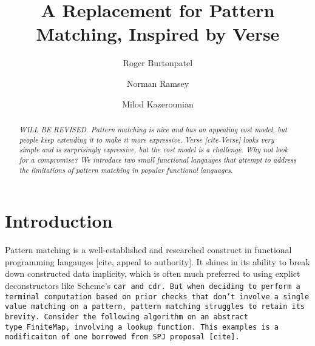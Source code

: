 \documentclass[manuscript,screen,review, 12pt]{acmart}
\begin{document}
\title{A Replacement for Pattern Matching, Inspired by Verse}

\author{Roger Burtonpatel}

\author{Norman Ramsey}

\author{Milod Kazerounian}

\renewcommand{\shortauthors}{Burtonpatel et al.}

\begin{abstract}
    \it{WILL BE REVISED.}
  Pattern matching is nice and has an appealing cost model, but people keep
  extending it to make it more expressive. Verse [cite-Verse] looks very simple
  and is surprisingly expressive, but the cost model is a challenge. Why not
  look for a compromise? We introduce two small functional langauges that
  attempt to address the limitations of pattern matching in popular functional
  languages.
  \end{abstract}

\maketitle

\section{Introduction}
Pattern matching is a well-established and researched construct in functional
programming langauges [cite, appeal to authority]. It shines in its ability to
break down constructed data implicity, which is often much preferred to using
explict deconstructors like Scheme's \tt{car} and \tt{cdr}. But when deciding to
perform a terminal computation based on prior checks that don't involve a single
value matching on a pattern, pattern matching struggles to retain its brevity.
Consider the following algorithm on an abstract type~\tt{FiniteMap}, involving a
lookup function. This examples is a modificaiton of one borrowed from SPJ
proposal [cite]. 
\end{document}
